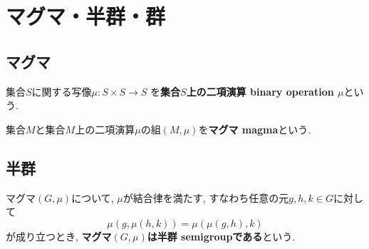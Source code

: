 \section{マグマ・半群・群}
\subsection{マグマ}
\begin{Def}
集合$S$に関する写像$\mu:S\times S\rightarrow S$
を{\bf 集合$S$上の二項演算 binary operation $\mu$}という.
\end{Def}
\begin{Def}
集合$M$と集合$M$上の二項演算$\mu$の組$(M,\mu)$を{\bf マグマ magma}という.
\end{Def}
\subsection{半群}
\begin{Def}
マグマ$(G,\mu)$について,
$\mu$が結合律を満たす, すなわち任意の元$g,h,k\in G$に対して\[\mu(g,\mu(h,k))=\mu(\mu(g,h),k)\]
が成り立つとき, {\bf マグマ$(G,\mu)$は半群 semigroupである}という.
\end{Def}
